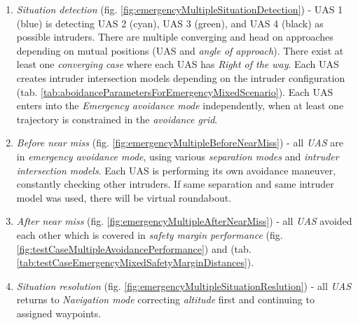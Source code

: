     \begin{enumerate}
        \item \emph{Situation detection} (fig. \ref{fig:emergencyMultipleSituationDetection}) - UAS 1 (blue) is detecting UAS 2 (cyan), UAS 3 (green), and UAS 4 (black) as possible intruders. There are multiple converging and head on approaches depending on mutual positions (UAS and \emph{angle of approach}). There exist at least one \emph{converging case} where each UAS has \emph{Right of the way}. Each UAS creates intruder intersection models depending on the intruder configuration (tab. \ref{tab:aboidanceParametersForEmergencyMixedScenario}). Each UAS enters into the \emph{Emergency avoidance mode} independently, when at least one trajectory is constrained in the \emph{avoidance grid}. 
        
        \item \emph{Before near miss} (fig. \ref{fig:emergencyMultipleBeforeNearMiss}) - all \emph{UAS} are in \emph{emergency avoidance mode}, using various \emph{separation modes} and \emph{intruder intersection models}. Each UAS is performing its own avoidance maneuver, constantly checking other intruders. If same separation and same intruder model was used, there will be virtual roundabout.
            
        \item \emph{After near miss} (fig. \ref{fig:emergencyMultipleAfterNearMiss}) - all \emph{UAS} avoided each other which is covered in \emph{safety margin performance} (fig. \ref{fig:testCaseMultipleAvoidancePerformance}) and (tab. \ref{tab:testCaseEmergencyMixedSafetyMarginDistances}).
        
        \item \emph{Situation resolution} (fig. \ref{fig:emergencyMultipleSituationReslution}) - all \emph{UAS}
        returns to \emph{Navigation mode} correcting \emph{altitude} first and continuing to assigned waypoints.
    \end{enumerate}
    
